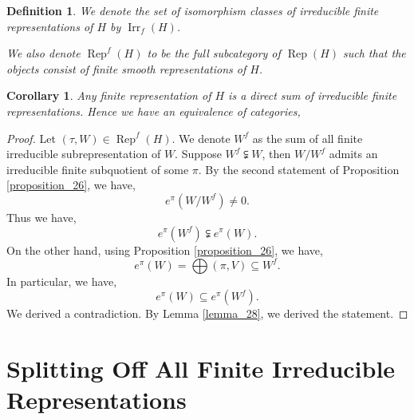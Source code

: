 \documentclass[8pt]{article}
\newtheorem{definition}{Definition}[section]
\newtheorem{corollary}{Corollary} [section]
\DeclareMathOperator{\Rep}{Rep}
\DeclareMathOperator{\Irr}{Irr}
\begin{document}
\begin{definition}
  We denote the set of isomorphism classes of irreducible finite representations of $H$ by $\Irr_f(H)$. 
  \par We also denote $\Rep^f(H)$ to be the full subcategory of $\Rep(H)$ such that the objects consist of finite smooth representations of $H$.
\end{definition}

\begin{corollary}
  \label{corollary_30}
  Any finite representation of $H$ is a direct sum of irreducible finite representations. Hence we have an equivalence of categories,
  \begin{center}
  \end{center}
\end{corollary}

\begin{proof}
  Let $(\tau, W)\in\Rep^f(H)$. We denote $W^f$ as the sum of all finite irreducible subrepresentation of $W$.
  Suppose $W^f\subsetneqq W$, then $W/W^f$ admits an irreducible finite subquotient of some $\pi$. By the second statement of Proposition \ref{proposition_26}, we have,
  \begin{equation*}
    e^\pi(W/W^f)\not=0.
  \end{equation*}
  Thus we have,
  \begin{equation*}
    e^\pi(W^f)\subsetneqq e^\pi(W).
  \end{equation*}
  On the other hand, using Proposition \ref{proposition_26}, we have,
  \begin{equation*}
    e^\pi(W) = \bigoplus(\pi,V)\subseteq W^f.
  \end{equation*}
  In particular, we have,
  \begin{equation*}
    e^\pi(W)\subseteq e^\pi(W^f).
  \end{equation*}
  We derived a contradiction. By Lemma \ref{lemma_28}, we derived the statement.
\end{proof}

\section{Splitting Off All Finite Irreducible Representations}
\end{document}
